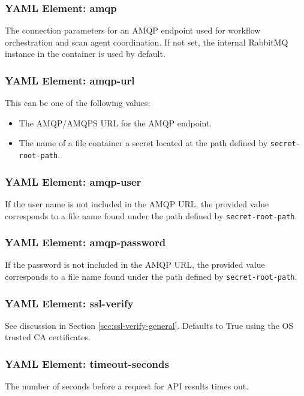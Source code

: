 \subsubsection{YAML Element: amqp}\label{sec:yaml-generic-amqp}
The connection parameters for an AMQP endpoint used for workflow orchestration and scan agent coordination. 
If not set, the internal RabbitMQ instance in the \cxoneflow container is used by default.

\subsubsection{YAML Element: amqp-url}\label{sec:yaml-generic-amqp-amqp-url}
This can be one of the following values:

\begin{itemize}
  \item The AMQP/AMQPS URL for the AMQP endpoint.
  \item The name of a file container a secret located at the path defined by \texttt{secret-root-path}.
\end{itemize}


\subsubsection{YAML Element: amqp-user}\label{sec:yaml-generic-amqp-amqp-user}
If the user name is not included in the AMQP URL, the provided value corresponds to a file name found under
the path defined by \texttt{secret-root-path}.

\subsubsection{YAML Element: amqp-password}\label{sec:yaml-generic-amqp-amqp-password}
If the password is not included in the AMQP URL, the provided value corresponds to a file name found
under the path defined by \texttt{secret-root-path}.


\subsubsection{YAML Element: ssl-verify}\label{sec:yaml-generic-ssl-verify}
See discussion in Section \ref{sec:ssl-verify-general}.  Defaults to True using the OS trusted CA certificates.

\subsubsection{YAML Element: timeout-seconds}\label{sec:yaml-generic-timeout-seconds}
The number of seconds before a request for API results times out.

